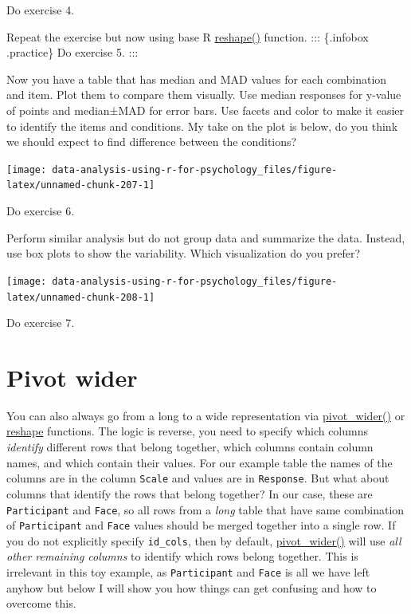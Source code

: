 \documentclass[
]{book}
\begin{document}
Do exercise 4.

Repeat the exercise but now using base R \href{https://stat.ethz.ch/R-manual/R-patched/library/stats/html/reshape.html}{reshape()} function.
::: \{.infobox .practice\}
Do exercise 5.
:::

Now you have a table that has median and MAD values for each combination and item. Plot them to compare them visually. Use median responses for y-value of points and median±MAD for error bars. Use facets and color to make it easier to identify the items and conditions. My take on the plot is below, do you think we should expect to find difference between the conditions?

\begin{center}\texttt{[image: data-analysis-using-r-for-psychology\_files/figure-latex/unnamed-chunk-207-1]} \end{center}

Do exercise 6.

Perform similar analysis but do not group data and summarize the data. Instead, use box plots to show the variability. Which visualization do you prefer?

\begin{center}\texttt{[image: data-analysis-using-r-for-psychology\_files/figure-latex/unnamed-chunk-208-1]} \end{center}

Do exercise 7.

\hypertarget{pivot-wider}{%
\section{Pivot wider}\label{pivot-wider}}

You can also always go from a long to a wide representation via \href{https://tidyr.tidyverse.org/reference/pivot_wider.html}{pivot\_wider()} or \href{https://stat.ethz.ch/R-manual/R-patched/library/stats/html/reshape.html}{reshape} functions. The logic is reverse, you need to specify which columns \emph{identify} different rows that belong together, which columns contain column names, and which contain their values. For our example table the names of the columns are in the column \texttt{Scale} and values are in \texttt{Response}. But what about columns that identify the rows that belong together? In our case, these are \texttt{Participant} and \texttt{Face}, so all rows from a \emph{long} table that have same combination of \texttt{Participant} and \texttt{Face} values should be merged together into a single row. If you do not explicitly specify \texttt{id\_cols}, then by default, \href{https://tidyr.tidyverse.org/reference/pivot_wider.html}{pivot\_wider()} will use \emph{all other remaining columns} to identify which rows belong together. This is irrelevant in this toy example, as \texttt{Participant} and \texttt{Face} is all we have left anyhow but below I will show you how things can get confusing and how to overcome this.
\end{document}
